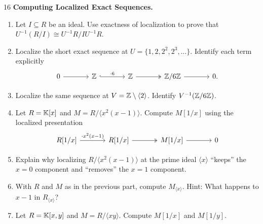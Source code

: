 \documentclass[Notebook.tex]{subfiles}
\begin{document}
\begin{problem}{16} \textbf{Computing Localized Exact Sequences.}
        
    \begin{enumerate}
        \item Let $I\subseteq R$ be an ideal. Use exactness of localization to prove that $U^{-1}(R/I)\cong U^{-1}R/IU^{-1}R$.
        \item Localize the short exact sequence at $U=\{1,2,2^2,2^3,\ldots\}$. Identify each term explicitly
        \[
        \begin{tikzcd}[column sep=large]
        0 \arrow[r] & \Z \arrow[r, hook, "\cdot 6"] & \Z \arrow[r, two heads] & \Z/6\Z \arrow[r] & 0.
        \end{tikzcd}
        \]
        \item Localize the same sequence at $V=\mathbb Z\setminus \langle 2\rangle$. Identify $V^{-1}(\mathbb Z/6\mathbb Z)$.
        \item Let $R=\mathbb K[x]$ and $M=R/\langle x^2(x-1)\rangle$. Compute $M[1/x]$ using the localized presentation
        \[
        \begin{tikzcd}[column sep=large]
        R[1/x] \arrow[r, "\cdot x^2(x-1)"] & R[1/x] \arrow[r, two heads] & M[1/x] \arrow[r] & 0
        \end{tikzcd}
        \]
        \item Explain why localizing $R/\langle x^2(x-1)\rangle$ at the prime ideal $\langle x\rangle$ “keeps” the $x=0$ component and “removes” the $x=1$ component.
        \item With $R$ and $M$ as in the previous part, compute $M_{\langle x\rangle}$. Hint: What happens to $x-1$ in $R_{\langle x\rangle}$?
        \item Let $R=\mathbb K[x,y]$ and $M=R/\langle xy\rangle$. Compute $M[1/x]$ and $M[1/y]$.
    \end{enumerate}
\end{problem}
\end{document}
